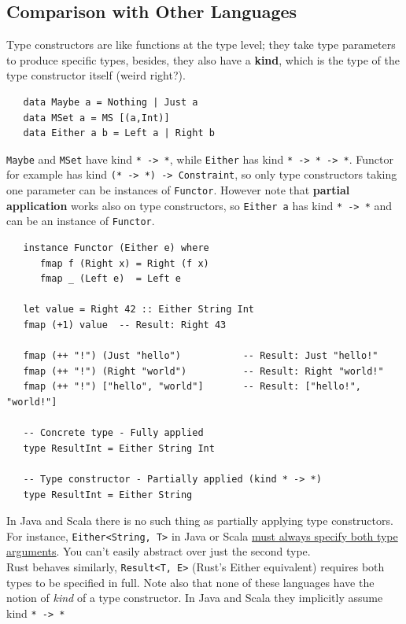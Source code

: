 \subsection{Comparison with Other Languages}
Type constructors are like functions at the type level; they take type parameters to produce specific types, besides, they also have a \textbf{kind}, which is the type of the type constructor itself (weird right?).
\begin{lstlisting}
   data Maybe a = Nothing | Just a
   data MSet a = MS [(a,Int)]
   data Either a b = Left a | Right b
\end{lstlisting}
\lstinline|Maybe| and \lstinline|MSet| have kind \lstinline|* -> *|, while \lstinline|Either| has kind \lstinline|* -> * -> *|.
Functor for example has kind \lstinline|(* -> *) -> Constraint|, so only type constructors taking one parameter can be instances of \lstinline|Functor|.
However note that \textbf{partial application} works also on type constructors, so \lstinline|Either a| has kind \lstinline|* -> *| and can be an instance of \lstinline|Functor|.
\begin{lstlisting}
   instance Functor (Either e) where
      fmap f (Right x) = Right (f x)
      fmap _ (Left e)  = Left e

   let value = Right 42 :: Either String Int
   fmap (+1) value  -- Result: Right 43

   fmap (++ "!") (Just "hello")           -- Result: Just "hello!"
   fmap (++ "!") (Right "world")          -- Result: Right "world!"
   fmap (++ "!") ["hello", "world"]       -- Result: ["hello!", "world!"]

   -- Concrete type - Fully applied
   type ResultInt = Either String Int

   -- Type constructor - Partially applied (kind * -> *)
   type ResultInt = Either String

\end{lstlisting}

In Java and Scala there is no such thing as partially applying type constructors. For instance, \lstinline|Either<String, T>| in Java or Scala \ul{must always specify both type arguments}. You can't easily abstract over just the second type.\\
Rust behaves similarly, \lstinline|Result<T, E>| (Rust's Either equivalent) requires both types to be specified in full.
Note also that none of these languages have the notion of \textit{kind} of a type constructor. In Java and Scala they implicitly assume kind \lstinline|* -> *|


